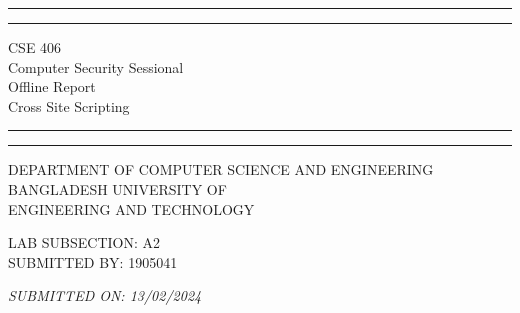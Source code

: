 \documentclass[a4paper, 11pt, oneside]{article} %
\begin{document}
\begin{titlepage} %

	\centering %
	
	\scshape %
	
	\vspace*{\baselineskip} %
	
	
	\rule{\textwidth}{1.6pt}\vspace*{-\baselineskip}\vspace*{2pt} %
	\rule{\textwidth}{0.4pt} %
	
	\vspace{0.75\baselineskip} %
	
	{\LARGE CSE 406\\ Computer Security Sessional\\ Offline Report\\ Cross Site Scripting} %
	
	\vspace{0.75\baselineskip} %
	
	\rule{\textwidth}{0.4pt}\vspace*{-\baselineskip}\vspace{3.2pt} %
	\rule{\textwidth}{1.6pt} %
	
	\vspace{\baselineskip} %
	
	

 {DEPARTMENT OF COMPUTER SCIENCE AND ENGINEERING \\ \vspace{0.75\baselineskip} BANGLADESH UNIVERSITY OF \\ \vspace{0.5\baselineskip} ENGINEERING AND TECHNOLOGY}%
	
	\vspace*{2\baselineskip} %
	
	
	LAB SUBSECTION: A2 \\
 \vspace{0.75\baselineskip}
        SUBMITTED BY: 1905041 \\
        \vspace{0.75\baselineskip}
   
	\vspace{1\baselineskip} %
	
	\textit{SUBMITTED ON: 13/02/2024} %
	

\end{titlepage}
\end{document}

